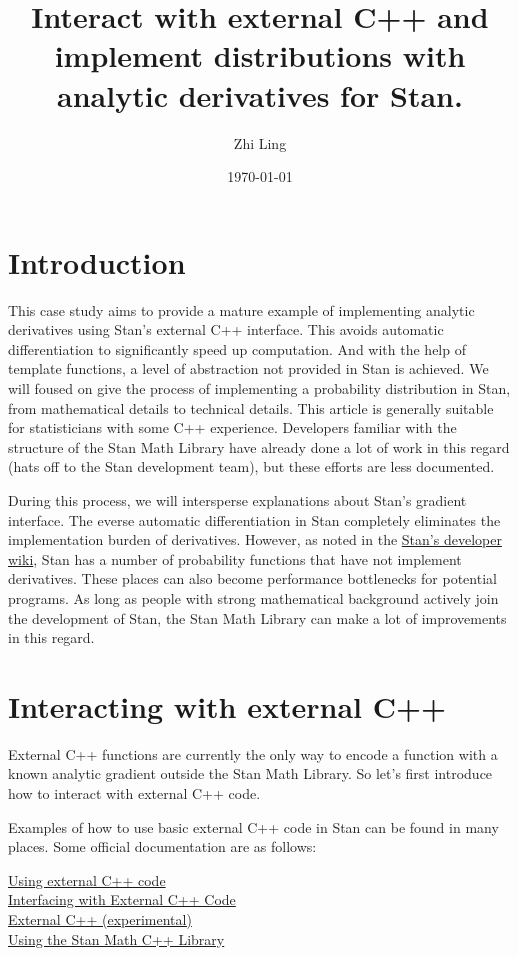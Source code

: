 \documentclass[11pt]{article}
\title{Interact with external C++ and implement distributions with analytic derivatives for Stan.}
\author{Zhi Ling}
\date{\today}
\begin{document}
\maketitle


\section{Introduction}

This case study aims to provide a mature example of implementing analytic derivatives using Stan's external C++ interface. This avoids automatic differentiation to significantly speed up computation. And with the help of template functions, a level of abstraction not provided in Stan is achieved. We will foused on give the process of implementing a  probability distribution in Stan, from mathematical details to technical details. This article is generally suitable for statisticians with some C++ experience. Developers familiar with the structure of the Stan Math Library have already done a lot of work in this regard (hats off to the Stan development team), but these efforts are less documented.


During this process, we will intersperse explanations about Stan's gradient interface. The everse automatic differentiation in Stan completely eliminates the implementation burden of derivatives. However, as noted in the \href{https://github.com/stan-dev/stan/wiki/Contributing-to-Stan-Without-C-Plus-Plus--Experience}{Stan's developer wiki}, Stan has a number of probability functions that have not implement derivatives. These places can also become performance bottlenecks for potential programs. As long as people with strong mathematical background actively join the development of Stan, the Stan Math Library can make a lot of improvements in this regard.




\section{Interacting with external C++}

External C++ functions are currently the only way to encode a function with a known analytic gradient outside the Stan Math Library. So let’s first introduce how to interact with external C++ code.

Examples of how to use basic external C++ code in Stan can be found in many places. Some official documentation are as follows:

\href{https://mc-stan.org/docs/cmdstan-guide/using-external-cpp-code.html}{Using external C++ code}\\
\href{https://mc-stan.org/rstan/articles/external.html}{Interfacing with External C++ Code}\\
\href{https://pystan2.readthedocs.io/en/latest/external_cpp.html}{External C++ (experimental)}\\
\href{https://cran.r-project.org/web/packages/StanHeaders/vignettes/stanmath.html}{Using the Stan Math C++ Library}
\end{document}

